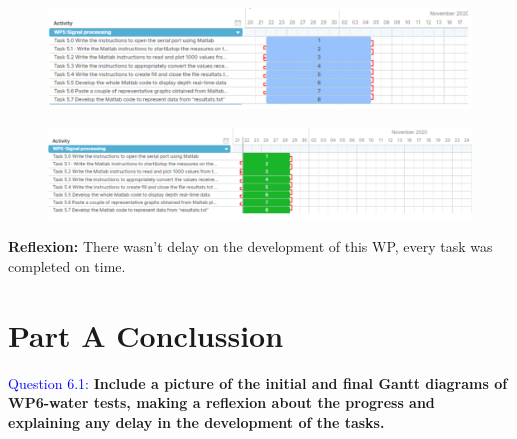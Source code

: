 \documentclass[12pt, a4papre]{article}
\begin{document}
	\begin{figure}[H]
		\begin{center}
		\includegraphics[width=135mm]{WP5_ini}
		\end{center}
	\end{figure}
	\begin{figure}[H]
		\begin{center}
		\includegraphics[width=135mm]{WP5_fin}
		\end{center}
	\end{figure}
	
	\textbf{Reflexion: } There wasn’t delay on the development of this WP, every task was completed on time.	
	
	\section{Part A Conclussion}
	
	\textcolor{blue}{Question 6.1:} \textbf{Include a picture of the initial and final Gantt diagrams of WP6-water tests, making a reflexion about the progress and explaining any delay in the development of the tasks.}
	
	
	

	
\end{document}
